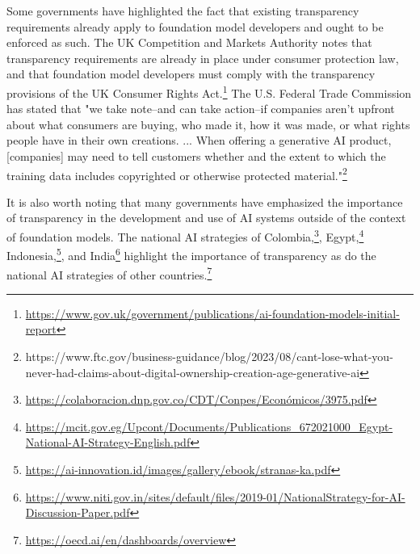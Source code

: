 \documentclass[screen, authorversion, acmsmall]{acmart}
\begin{document}
Some governments have highlighted the fact that existing transparency requirements already apply to foundation model developers and ought to be enforced as such.
The UK Competition and Markets Authority notes that transparency requirements are already in place under consumer protection law, and that foundation model developers must comply with the transparency provisions of the UK Consumer Rights Act.\footnote{\url{https://www.gov.uk/government/publications/ai-foundation-models-initial-report}} The U.S. Federal Trade Commission has stated that "we take note–and can take action–if companies aren’t upfront about what consumers are buying, who made it, how it was made, or what rights people have in their own creations. ... When offering a generative AI product, [companies] may need to tell customers whether and the extent to which the training data includes copyrighted or otherwise protected material."\footnote{https://www.ftc.gov/business-guidance/blog/2023/08/cant-lose-what-you-never-had-claims-about-digital-ownership-creation-age-generative-ai}

It is also worth noting that many governments have emphasized the importance of transparency in the development and use of AI systems outside of the context of foundation models. The national AI strategies of Colombia,\footnote{\url{https://colaboracion.dnp.gov.co/CDT/Conpes/Económicos/3975.pdf}}, Egypt,\footnote{\url{https://mcit.gov.eg/Upcont/Documents/Publications_672021000_Egypt-National-AI-Strategy-English.pdf}} Indonesia,\footnote{\url{https://ai-innovation.id/images/gallery/ebook/stranas-ka.pdf}}, and India\footnote{\url{https://www.niti.gov.in/sites/default/files/2019-01/NationalStrategy-for-AI-Discussion-Paper.pdf}} highlight the importance of transparency as do the national AI strategies of other countries.\footnote{\url{https://oecd.ai/en/dashboards/overview}} 
\end{document}
